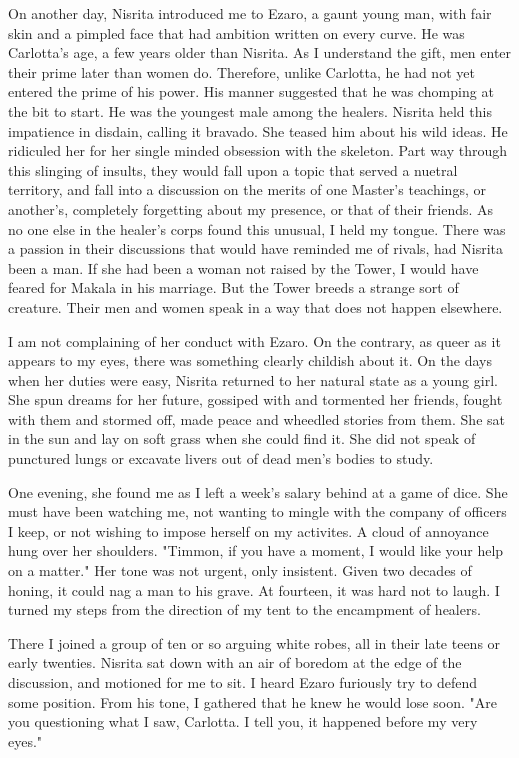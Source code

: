\documentclass{article}
\begin{document}
On another day, Nisrita introduced me to Ezaro, a gaunt young man, with fair skin and a pimpled face that had ambition written on every curve. He was Carlotta's age, a few years older than Nisrita. As I understand the gift, men enter their prime later than women do. Therefore, unlike Carlotta, he had not yet entered the prime of his power. His manner suggested that he was chomping at the bit to start. He was the youngest male among the healers. Nisrita held this impatience in disdain, calling it bravado. She teased him about his wild ideas. He ridiculed her for her single minded obsession with the skeleton. Part way through this slinging of insults, they would fall upon a topic that served a nuetral territory, and fall into a discussion on the merits of one Master's teachings, or another's, completely forgetting about my presence, or that of their friends. As no one else in the healer's corps found this unusual, I held my tongue. There was a passion in their discussions that would have reminded me of rivals, had Nisrita been a man. If she had been a woman not raised by the Tower, I would have feared for Makala in his marriage. But the Tower breeds a strange sort of creature. Their men and women speak in a way that does not happen elsewhere. 

I am not complaining of her conduct with Ezaro. On the contrary, as queer as it appears to my eyes, there was something clearly childish about it. On the days when her duties were easy, Nisrita returned to her natural state as a young girl. She spun dreams for her future, gossiped with and tormented her friends, fought with them and stormed off, made peace and wheedled stories from them. She sat in the sun and lay on soft grass when she could find it. She did not speak of punctured lungs or excavate livers out of dead men's bodies to study.

One evening, she found me as I left a week's salary behind at a game of dice. She must have been watching me, not wanting to mingle with the company of officers I keep, or not wishing to impose herself on my activites. A cloud of annoyance hung over her shoulders. "Timmon, if you have a moment, I would like your help on a matter." Her tone was not urgent, only insistent. Given two decades of honing, it could nag a man to his grave. At fourteen, it was hard not to laugh. I turned my steps from the direction of my tent to the encampment of healers. 

There I joined a group of ten or so arguing white robes, all in their late teens or early twenties. Nisrita sat down with an air of boredom at the edge of the  discussion, and motioned for me to sit. I heard Ezaro furiously try to defend some position. From his tone, I gathered that he knew he would lose soon. "Are you questioning what I saw, Carlotta. I tell you, it happened before my very eyes."
\end{document}
